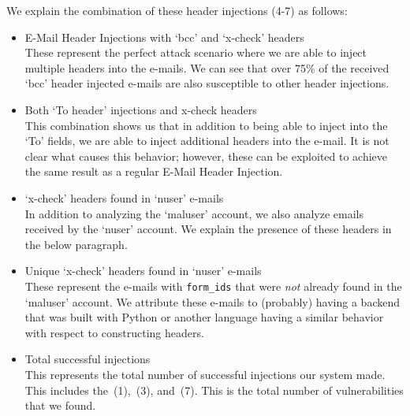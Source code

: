 
We explain the combination of these header injections (4-7) as follows:
\begin{itemize}
	\item E-Mail Header Injections with `bcc' and `x-check' headers\\
	These represent the perfect attack scenario where we are able to inject multiple headers into the e-mails. We can see that over 75\% of the received `bcc' header injected e-mails are also susceptible to other header injections.
	
	\item Both `To header' injections and x-check headers \\
	This combination shows us that in addition to being able to inject into the `To' fields, we are able to inject additional headers into the e-mail. It is not clear what causes this behavior; however, these can be exploited to achieve the same result as a regular E-Mail Header Injection.
	
	\item `x-check' headers found in `nuser' e-mails\\
	In addition to analyzing the `maluser' account, we also analyze emails received by the `nuser' account. We explain the presence of these headers in the below paragraph.

	\item Unique `x-check' headers found in `nuser' e-mails\\
	These represent the e-mails with \lstinline|form_ids| that were \emph{not} already found in the `maluser' account. We attribute these e-mails to (probably) having a backend that was built with Python or another language having a similar behavior with respect to constructing headers.
	
	\item Total successful injections\\
	This represents the total number of successful injections our system made. This includes the \,(1), \,(3), and \,(7). This is the total number of vulnerabilities that we found.
	
\end{itemize}
